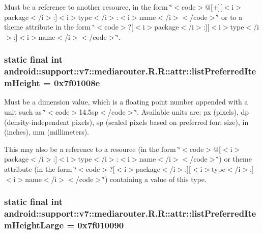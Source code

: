 Must be a reference to another resource, in the form \char`\"{}$<$code$>$@\mbox{[}+\mbox{]}\mbox{[}$<$i$>$package$<$/i$>$:\mbox{]}$<$i$>$type$<$/i$>$:$<$i$>$name$<$/i$>$$<$/code$>$\char`\"{} or to a theme attribute in the form \char`\"{}$<$code$>$?\mbox{[}$<$i$>$package$<$/i$>$:\mbox{]}\mbox{[}$<$i$>$type$<$/i$>$:\mbox{]}$<$i$>$name$<$/i$>$$<$/code$>$\char`\"{}. \hypertarget{classandroid_1_1support_1_1v7_1_1mediarouter_1_1_r_1_1attr_5fd7f13c7d7328e49962eac38307904a}{
\subsubsection[{listPreferredItemHeight}]{\setlength{\rightskip}{0pt plus 5cm}static final int android::support::v7::mediarouter.R.R::attr::listPreferredItemHeight = 0x7f01008e}}
\label{classandroid_1_1support_1_1v7_1_1mediarouter_1_1_r_1_1attr_5fd7f13c7d7328e49962eac38307904a}


Must be a dimension value, which is a floating point number appended with a unit such as \char`\"{}$<$code$>$14.5sp$<$/code$>$\char`\"{}. Available units are: px (pixels), dp (density-independent pixels), sp (scaled pixels based on preferred font size), in (inches), mm (millimeters). 

This may also be a reference to a resource (in the form \char`\"{}$<$code$>$@\mbox{[}$<$i$>$package$<$/i$>$:\mbox{]}$<$i$>$type$<$/i$>$:$<$i$>$name$<$/i$>$$<$/code$>$\char`\"{}) or theme attribute (in the form \char`\"{}$<$code$>$?\mbox{[}$<$i$>$package$<$/i$>$:\mbox{]}\mbox{[}$<$i$>$type$<$/i$>$:\mbox{]}$<$i$>$name$<$/i$>$$<$/code$>$\char`\"{}) containing a value of this type. \hypertarget{classandroid_1_1support_1_1v7_1_1mediarouter_1_1_r_1_1attr_6f4fd369e01ea45989ba6ca4e1e3094f}{
\subsubsection[{listPreferredItemHeightLarge}]{\setlength{\rightskip}{0pt plus 5cm}static final int android::support::v7::mediarouter.R.R::attr::listPreferredItemHeightLarge = 0x7f010090}}
\label{classandroid_1_1support_1_1v7_1_1mediarouter_1_1_r_1_1attr_6f4fd369e01ea45989ba6ca4e1e3094f}


